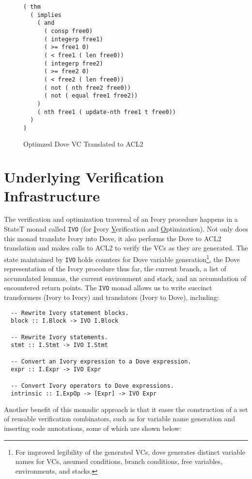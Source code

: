 \documentclass{article}
\begin{document}
\begin{figure}
  \caption{Optimzed Dove VC Translated to ACL2}
  \label{fig:openValveAVC1ACL2}
  \begin{lstlisting}
( thm
  ( implies
    ( and
      ( consp free0)
      ( integerp free1)
      ( >= free1 0)
      ( < free1 ( len free0))
      ( integerp free2)
      ( >= free2 0)
      ( < free2 ( len free0))
      ( not ( nth free2 free0))
      ( not ( equal free1 free2))
    )
    ( nth free1 ( update-nth free1 t free0))
  )
)
  \end{lstlisting}
\end{figure}

\section{Underlying Verification Infrastructure}

The verification and optimization traversal
of an Ivory procedure happens in a StateT monad called \texttt{IVO}
(for \underline{I}vory \underline{V}erification and \underline{O}ptimization).
Not only does this monad translate Ivory into Dove, it also performs the Dove to ACL2
translation and makes calls to ACL2 to verify the VCs as they are generated.
The state maintained by \texttt{IVO} holds
counters for Dove variable generation\footnote{For improved legibility of the generated VCs,
dove generates distinct variable names
for VCs, assumed conditions, branch conditions, free variables,
environments, and stacks.},
the Dove representation of the Ivory procedure thus far,
the current branch,
a list of accumulated lemmas,
the current environment and stack, and an accumulation
of encountered return points.
The \texttt{IVO} monad allows us to write
succinct transformers (Ivory to Ivory) and translators (Ivory to Dove),
including:

\begin{lstlisting}
  -- Rewrite Ivory statement blocks.
  block :: I.Block -> IVO I.Block
  
  -- Rewrite Ivory statements.
  stmt :: I.Stmt -> IVO I.Stmt
  
  -- Convert an Ivory expression to a Dove expression.
  expr :: I.Expr -> IVO Expr
  
  -- Convert Ivory operators to Dove expressions.
  intrinsic :: I.ExpOp -> [Expr] -> IVO Expr
\end{lstlisting}

Another benefit of this monadic approach is that it
eases the construction of a set of reusable verification combinators,
such as for variable name generation and inserting code annotations, 
some of which are shown below:
\end{document}
